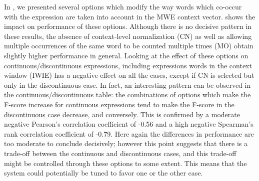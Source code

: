 \documentclass[output=paper
,modfonts
,nonflat]{langsci/langscibook}
\begin{document}
In , we presented several options
which modify the way words which co-occur with the expression are
taken into account in the MWE context vector. 
 shows the impact on performance of these
options. Although there is no decisive pattern in these results, the
absence of context-level normalization (CN) as well as allowing
multiple occurrences of the same word to be counted multiple times
(MO) obtain slightly higher performance in general. Looking at the
effect of these options on continuous/discontinuous expressions,
including expressions words in the context window (IWIE) has a
negative effect on all the cases, except if CN is selected but only in
the discontinuous case. In fact, an interesting pattern can be
observed in the continuous/discontinuous table: the combinations of
options which make the F-score increase for continuous expressions
tend to make the F-score in the discontinuous case decrease, and
conversely. This is confirmed by a moderate negative Pearson's
correlation coefficient of -0.56 and a high negative Spearman's rank
correlation coefficient of -0.79. Here again the differences in
performance are too moderate to conclude decisively; however this
point suggests that there is a trade-off between the continuous and
discontinuous cases, and this trade-off might be controlled through
these options to some extent. This means that the system could
potentially be tuned to favor one or the other case.


%
%





\end{document}
